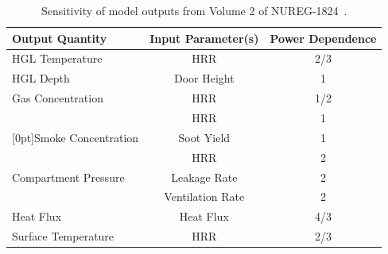 \documentclass[fleqn,b5paper]{article}
\begin{document}
\begin{table}[ht]
\caption{Sensitivity of model outputs from Volume 2 of NUREG-1824~\cite{NUREG_1824}. }
\begin{center}
\begin{tabular}{|l|c|c|}
\hline
Output Quantity                                 & Input Parameter(s)    & Power Dependence \\ \hline \hline
HGL Temperature                                 & HRR                   & 2/3    \\ \hline
HGL Depth                                       & Door Height           & 1      \\ \hline
Gas Concentration                               & HRR                   & 1/2    \\ \hline
                                                & HRR                   & 1      \\ \cline{2-3}
\raisebox{1.5ex}[0pt]{Smoke Concentration}      & Soot Yield            & 1      \\ \hline
                                                & HRR                   & 2      \\ \cline{2-3}
Compartment Pressure                            & Leakage Rate          & 2      \\ \cline{2-3}
                                                & Ventilation Rate      & 2      \\ \hline
Heat Flux                                       & Heat Flux             & 4/3    \\ \hline
Surface Temperature                             & HRR                   & 2/3    \\ \hline
\end{tabular}
\end{center}
\label{Parameter_Uncertainty}
\end{table}
\end{document}
